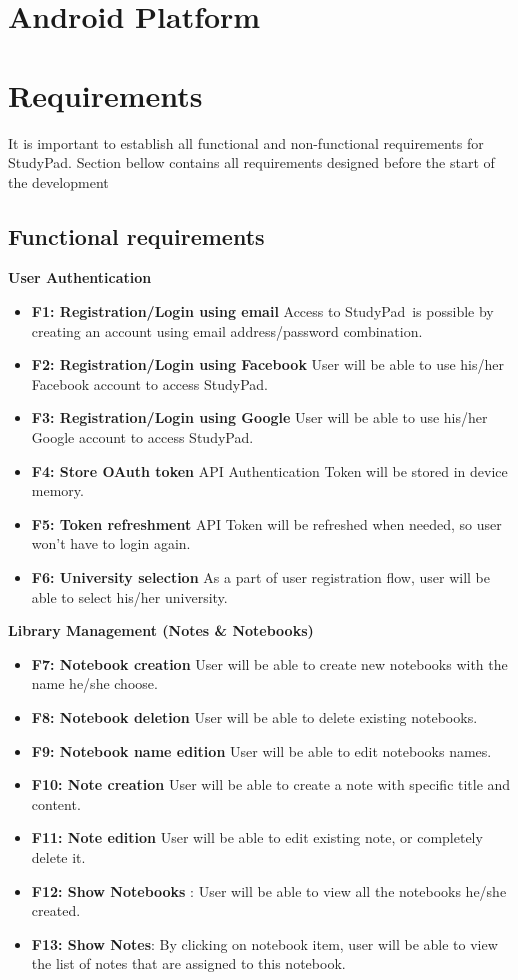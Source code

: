 \documentclass[thesis=B,english]{FITthesis}[2012/10/20]
\newcommand{\appname}{StudyPad}
\begin{document}
\section{Android Platform}

\newpage
\section{Requirements}
It is important to establish all functional and non-functional requirements for \appname. Section bellow contains all requirements designed before the start
of the development

\subsection{Functional requirements}
\bigskip
\textbf{User Authentication}
\begin{itemize}
	\item \textbf{F1: Registration/Login using email} Access to \appname\ is possible by creating an account using email address/password combination.
	\item \textbf{F2: Registration/Login using Facebook} User will be able to use his/her Facebook account to access \appname.
	\item \textbf{F3: Registration/Login using Google} User will be able to use his/her Google account to access \appname.
	\item \textbf{F4: Store OAuth token} API Authentication Token will be stored in device memory.
	\item \textbf{F5: Token refreshment} API Token will be refreshed when needed, so user won't have to login again.
	\item \textbf{F6: University selection} As a part of user registration flow, user will be able to select his/her university.
\end{itemize}
\bigskip
\textbf{Library Management (Notes \& Notebooks)}
\begin{itemize}
	\item \textbf{F7: Notebook creation} User will be able to create new notebooks with the name he/she choose.
	\item \textbf{F8: Notebook deletion} User will be able to delete existing notebooks.
	\item \textbf{F9: Notebook name edition} User will be able to edit notebooks names.
	\item \textbf{F10: Note creation} User will be able to create a note with specific title and content.
	\item \textbf{F11: Note edition} User will be able to edit existing note, or completely delete it.
	\item \textbf{F12: Show Notebooks} : User will be able to view all the notebooks he/she created.
	\item \textbf{F13: Show Notes}: By clicking on notebook item, user will be able to view the list of notes that are assigned to this notebook.
\end{itemize}
\end{document}

